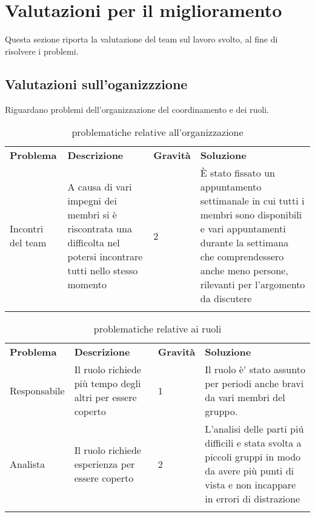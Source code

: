 \section{Valutazioni per il miglioramento}
Questa sezione riporta la valutazione del team sul lavoro svolto, al fine di risolvere i problemi.

\subsection{Valutazioni sull'oganizzzione}
Riguardano problemi dell'organizzazione del coordinamento e dei ruoli.

\begin{center}
    \centering
    \renewcommand{\arraystretch}{1.8}
    \label{tab:ValutazioneOrganizzazione}
    \begin{longtable}[!h]{p{60px} p{150px} p{50px} p{150px}}
        \rowcolor{logo!70}   \textbf{Problema} & \textbf{Descrizione} & \textbf{Gravit\`a} & \textbf{Soluzione} \\
        Incontri del team & A causa di vari impegni dei membri si \`e riscontrata una difficolta nel potersi incontrare tutti nello stesso momento & 2 & \`E stato fissato un appuntamento settimanale in cui tutti i membri sono disponibili e vari appuntamenti durante la settimana che comprendessero anche meno persone, rilevanti per l'argomento da discutere\\
    \rowcolor{white}\caption{problematiche relative all'organizzazione}            
    \end{longtable}    
\end{center}

\begin{center}
    \centering
    \renewcommand{\arraystretch}{1.8}
    \label{tab:ValutazioneRuoli}
    \begin{longtable}[!h]{p{60px} p{150px} p{50px} p{150px}}
        \rowcolor{logo!70}   \textbf{Problema} & \textbf{Descrizione} & \textbf{Gravit\`a} & \textbf{Soluzione} \\
        Responsabile & Il ruolo richiede pi\`u tempo degli altri per essere coperto & 1 & Il ruolo \`e' stato assunto per periodi anche bravi da vari membri del gruppo. \\
        Analista & Il ruolo richiede esperienza per essere coperto & 2 & L'analisi delle parti pi\'u difficili e stata svolta a piccoli gruppi in modo da avere pi\`u punti di vista e non incappare in errori di distrazione \\
    \rowcolor{white}\caption{problematiche relative ai ruoli}            
    \end{longtable}    
\end{center}

